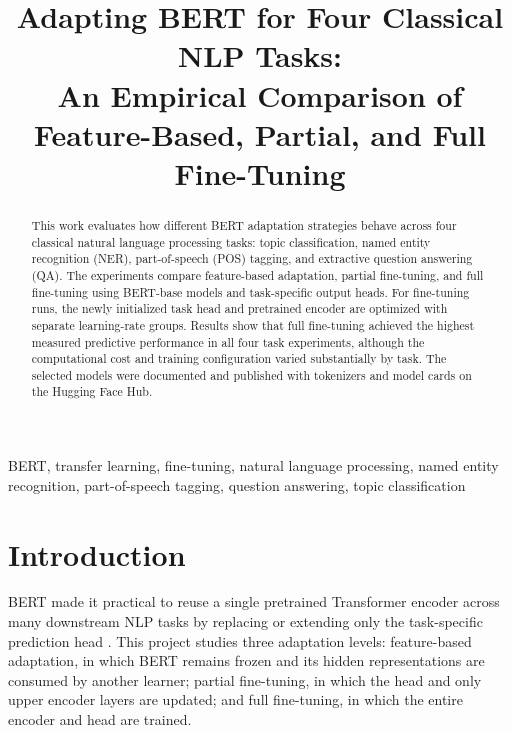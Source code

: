 \documentclass[conference]{IEEEtran}
\begin{document}
\title{Adapting BERT for Four Classical NLP Tasks:\\
An Empirical Comparison of Feature-Based, Partial, and Full Fine-Tuning}

\author{
}

\maketitle

\begin{abstract}
This work evaluates how different BERT adaptation strategies behave across four classical natural language processing tasks: topic classification, named entity recognition (NER), part-of-speech (POS) tagging, and extractive question answering (QA). The experiments compare feature-based adaptation, partial fine-tuning, and full fine-tuning using BERT-base models and task-specific output heads. For fine-tuning runs, the newly initialized task head and pretrained encoder are optimized with separate learning-rate groups. Results show that full fine-tuning achieved the highest measured predictive performance in all four task experiments, although the computational cost and training configuration varied substantially by task. The selected models were documented and published with tokenizers and model cards on the Hugging Face Hub.
\end{abstract}

\begin{IEEEkeywords}
BERT, transfer learning, fine-tuning, natural language processing, named entity recognition, part-of-speech tagging, question answering, topic classification
\end{IEEEkeywords}

\section{Introduction}
BERT made it practical to reuse a single pretrained Transformer encoder across many downstream NLP tasks by replacing or extending only the task-specific prediction head \cite{devlin2019bert}. This project studies three adaptation levels: feature-based adaptation, in which BERT remains frozen and its hidden representations are consumed by another learner; partial fine-tuning, in which the head and only upper encoder layers are updated; and full fine-tuning, in which the entire encoder and head are trained.
\end{document}
